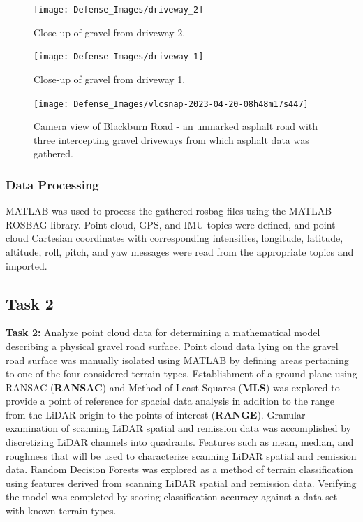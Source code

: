 \documentclass[numbered,pdftex]{ohio-etd}
\begin{document}
{{{{				\begin{figure}[H]
					\centering
					\texttt{[image: Defense\_Images/driveway\_2]}
					\caption[Driveway 2 Gravel]{Close-up of gravel from driveway 2.}
					\label{fig:driveway_2}
				\end{figure}
				
				\begin{figure}[H]
					\centering
					\texttt{[image: Defense\_Images/driveway\_1]}
					\caption[Driveway 2 Gravel]{Close-up of gravel from driveway 1.}
					\label{fig:driveway_1}
				\end{figure}
				
				\begin{figure}[H]
					\centering
					\texttt{[image: Defense\_Images/vlcsnap-2023-04-20-08h48m17s447]}
					\caption[Blackburn Road Camera View]{Camera view of Blackburn Road - an unmarked asphalt road with three intercepting gravel driveways from which asphalt data was gathered.}
					\label{fig:Blackburn_Road_View}
				\end{figure}
				
				
				
										
			} %
				
			\subsubsection{Data Processing}\label{sec:data_processing}{

				{MATLAB was used to process the gathered rosbag files using the MATLAB ROSBAG library. Point cloud, GPS, and IMU topics were defined, and point cloud Cartesian coordinates with corresponding intensities, longitude, latitude, altitude, roll, pitch, and yaw messages were read from the appropriate topics and imported.}
		
			} %
				
		} %

		\subsection{Task 2}{

			\textbf{Task 2: }{Analyze point cloud data for determining a mathematical model describing a physical gravel road surface. Point cloud data lying on the gravel road surface was manually isolated using MATLAB by defining areas pertaining to one of the four considered terrain types. Establishment of a ground plane using RANSAC (\textbf{RANSAC}) and Method of Least Squares (\textbf{MLS}) was explored to provide a point of reference for spacial data analysis in addition to the range from the LiDAR origin to the points of interest (\textbf{RANGE}). Granular examination of scanning LiDAR spatial and remission data was accomplished by discretizing LiDAR channels into quadrants. Features such as mean, median, and roughness that will be used to characterize scanning LiDAR spatial and remission data. Random Decision Forests was explored as a method of terrain classification using features derived from scanning LiDAR spatial and remission data. Verifying the model was completed by scoring classification accuracy against a  data set with known terrain types.}
			
}}}
\end{document}
